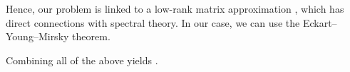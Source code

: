 
Hence, our problem is linked to a low-rank matrix approximation \citep{low_rank}, which has direct connections with spectral theory. In our case, we can use the Eckart–Young–Mirsky theorem.


Combining all of the above yields .


